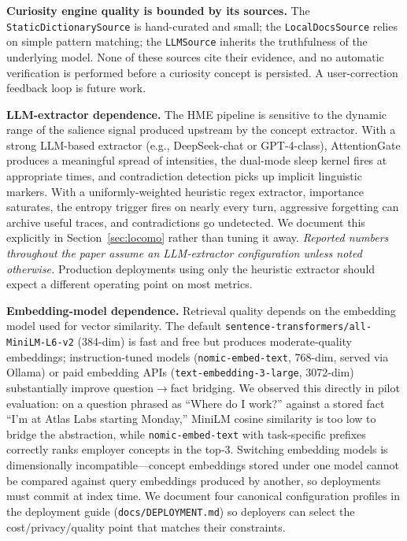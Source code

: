 \documentclass[11pt,twocolumn]{article}
\begin{document}
\textbf{Curiosity engine quality is bounded by its sources.} The \texttt{StaticDictionarySource} is hand-curated and small; the \texttt{LocalDocsSource} relies on simple pattern matching; the \texttt{LLMSource} inherits the truthfulness of the underlying model. None of these sources cite their evidence, and no automatic verification is performed before a curiosity concept is persisted. A user-correction feedback loop is future work.

\textbf{LLM-extractor dependence.} The HME pipeline is sensitive to the dynamic range of the salience signal produced upstream by the concept extractor. With a strong LLM-based extractor (e.g., DeepSeek-chat or GPT-4-class), AttentionGate produces a meaningful spread of intensities, the dual-mode sleep kernel fires at appropriate times, and contradiction detection picks up implicit linguistic markers. With a uniformly-weighted heuristic regex extractor, importance saturates, the entropy trigger fires on nearly every turn, aggressive forgetting can archive useful traces, and contradictions go undetected. We document this explicitly in Section~\ref{sec:locomo} rather than tuning it away. \emph{Reported numbers throughout the paper assume an LLM-extractor configuration unless noted otherwise.} Production deployments using only the heuristic extractor should expect a different operating point on most metrics.

\textbf{Embedding-model dependence.} Retrieval quality depends on the embedding model used for vector similarity. The default \texttt{sentence-transformers/all-MiniLM-L6-v2} (384-dim) is fast and free but produces moderate-quality embeddings; instruction-tuned models (\texttt{nomic-embed-text}, 768-dim, served via Ollama) or paid embedding APIs (\texttt{text-embedding-3-large}, 3072-dim) substantially improve question$\to$fact bridging. We observed this directly in pilot evaluation: on a question phrased as ``Where do I work?'' against a stored fact ``I'm at Atlas Labs starting Monday,'' MiniLM cosine similarity is too low to bridge the abstraction, while \texttt{nomic-embed-text} with task-specific prefixes correctly ranks employer concepts in the top-3. Switching embedding models is dimensionally incompatible---concept embeddings stored under one model cannot be compared against query embeddings produced by another, so deployments must commit at index time. We document four canonical configuration profiles in the deployment guide (\texttt{docs/DEPLOYMENT.md}) so deployers can select the cost/privacy/quality point that matches their constraints.
\end{document}
